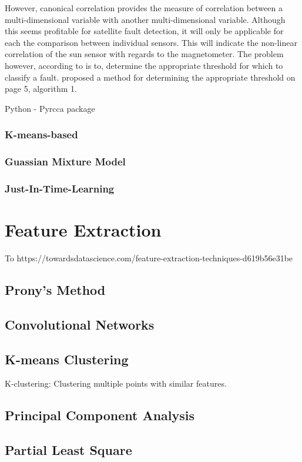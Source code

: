However, canonical correlation provides the measure of correlation between a multi-dimensional variable with another multi-dimensional variable. Although this seems profitable for satellite fault detection, it will only be applicable for each the comparison between individual sensors. This will indicate the non-linear correlation of the sun sensor with regards to the magnetometer. The problem however, according to \textcite{chen2017fault} is to, determine the appropriate threshold for which to classify a fault. \textcite{chen2017fault} proposed a method for determining the appropriate threshold on page 5, algorithm 1.
\cite{fukumizu2007statistical}
\cite{zhu2017quality}

Python - Pyrcca package

\subsubsection{K-means-based}
\subsubsection{Guassian Mixture Model}
\subsubsection{Just-In-Time-Learning}
\cite{chen2020just}

\section{Feature Extraction}
To 
https://towardsdatascience.com/feature-extraction-techniques-d619b56e31be
\subsection{Prony's Method}
\subsection{Convolutional Networks}
\subsection{K-means Clustering}
K-clustering: Clustering multiple points with similar features.
\subsection{Principal Component Analysis}
\cite{choi2005fault}
\cite{ding2010application}
\subsection{Partial Least Square}
